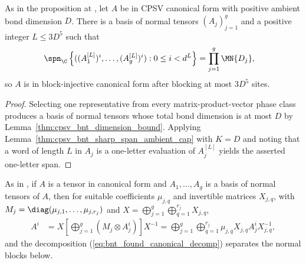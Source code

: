 \begin{lemma}
    \label{thm:cpsv_literal_propblockinj}
    \leanok
    As in the proposition at \cite[lines~342--345]{Cirac2016MPDO_arXiv}, let
    $A$ be in CPSV canonical form with positive ambient bond dimension $D$.
    There is a basis of normal tensors $(A_j)_{j=1}^{g}$ and a positive integer
    $L\leq3D^5$ such that
    \begin{align}
        \spn_{\C}\left\{((A_1^{[L]})^i,\ldots,(A_g^{[L]})^i):
        0\leq i<d^L\right\}
         & =\prod_{j=1}^{g}\MN{D_j},
        \notag
    \end{align}
    so $A$ is in block-injective canonical form after blocking at most $3D^5$
    sites.
\end{lemma}

\begin{proof}
    \leanok
    Selecting one representative from every matrix-product-vector phase class
    produces a basis of normal tensors whose total bond dimension is at most
    $D$ by Lemma~\ref{thm:cpsv_bnt_dimension_bound}. Applying
    Lemma~\ref{thm:cpsv_bnt_sharp_span_ambient_cap} with $K=D$ and noting
    that a word of length $L$ in $A_j$ is a one-letter evaluation of
    $A_j^{[L]}$ yields the asserted one-letter span.
\end{proof}

As in \cite[Section~2.3, Equations~(20a)--(21)]{Cirac2016MPDO_arXiv}, if $A$
is a tensor in canonical form and $A_1,\ldots,A_g$ is a basis of normal tensors
of $A$, then for suitable coefficients $\mu_{j,q}$ and invertible matrices
$X_{j,q}$, with $M_j=\diag(\mu_{j,1},\ldots,\mu_{j,r_j})$ and
$X=\bigoplus_{j=1}^{g}\bigoplus_{q=1}^{r_j}X_{j,q}$,
\begin{align}
    A^i
     & =X\left[\bigoplus_{j=1}^{g}
        \left(M_j\otimes A_j^i\right)\right]X^{-1}
    =\bigoplus_{j=1}^{g}\bigoplus_{q=1}^{r_j}
    \mu_{j,q}X_{j,q}A_j^iX_{j,q}^{-1},
    \label{eq:bnt_found_canonical_decomp}
\end{align}
and the decomposition (\ref{eq:bnt_found_canonical_decomp}) separates the
normal blocks below.
